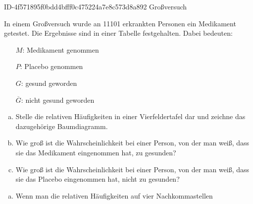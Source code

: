 \begin{exercise}
      {ID-4f571895f0bdd4bfff0c475224a7e8c573d8a892}
      {Großversuch}
  \ifproblem\problem\par
    In einem Großversuch wurde an \num{11101} erkrankten Personen ein
    Medikament getestet. Die Ergebnisse sind in einer Tabelle festgehalten.
    Dabei bedeuten:
    \begin{center}
      \begin{minipage}{0.45\linewidth}
        \begin{itemize}
          \setlength{\itemsep}{-0.1\baselineskip}
          \item[$M$:]            Medikament genommen
          \item[$P$:]            Placebo genommen
          \item[$G$:]            gesund geworden
          \item[$\overline{G}$:] nicht gesund geworden
        \end{itemize}%
      \end{minipage}%
      \begin{minipage}{0.45\linewidth}
        \centering
        \begin{fourfoldtable}
        \end{fourfoldtable}
      \end{minipage}%
    \end{center}%
    \begin{enumerate}[a)]
      \item Stelle die relativen Häufigkeiten in einer Vierfeldertafel dar
            und zeichne das dazugehörige Baumdiagramm.
      \item Wie groß ist die Wahrscheinlichkeit bei einer Person, von der
            man weiß, dass sie das Medikament eingenommen hat, zu gesunden?
      \item Wie groß ist die Wahrscheinlichkeit bei einer Person, von der
            man weiß, dass sie das Placebo eingenommen hat, nicht zu gesunden?
    \end{enumerate}
  \fi
  \ifoutcome\outcome\par
    \begin{enumerate}[a)]
      \item Wenn man die relativen Häufigkeiten auf vier Nachkommastellen

\end{enumerate}
\end{exercise}
